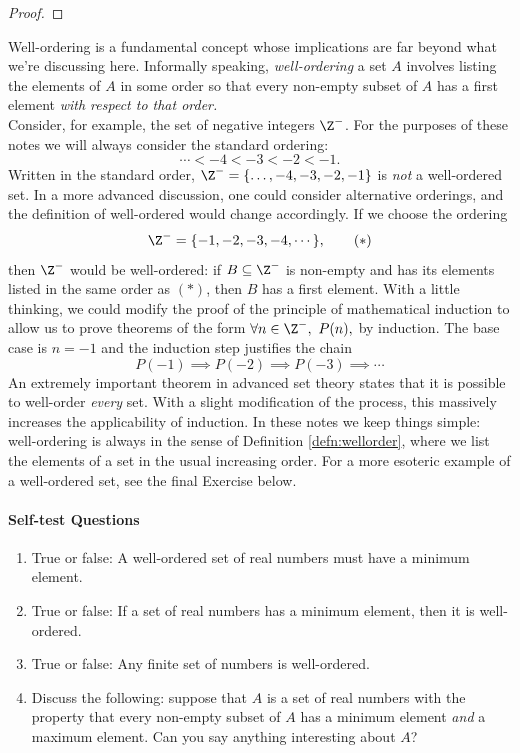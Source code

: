 \begin{proof}
\end{proof}

\begin{aside}

Well-ordering is a fundamental concept whose implications are far beyond what we're discussing here. Informally speaking, \emph{well-ordering} a set $A$ involves listing the elements of $A$ in some order so that every non-empty subset of $A$ has a first element \emph{with respect to that order.}\\
Consider, for example, the set of negative integers $\Z^-$. For the purposes of these notes we will always consider the standard ordering:
\[\cdots<-4<-3<-2<-1.\]
Written in the standard order, $\Z^-=\{\ldots,-4,-3,-2,-1\}$ is \emph{not} a well-ordered set. In a more advanced discussion, one could consider alternative orderings, and the definition of well-ordered would change accordingly. If we choose the ordering
\[\Z^-=\{-1,-2,-3,-4,\cdots\},\tag{$\ast$}\]
then $\Z^-$ would be well-ordered: if $B\subseteq\Z^-$ is non-empty and has its elements listed in the same order as $(\ast)$, then $B$ has a first element. With a little thinking, we could modify the proof of the principle of mathematical induction to allow us to prove theorems of the form $\forall n\in\Z^-,\ P(n),$ by induction. The base case is $n=-1$ and the induction step justifies the chain
\[P(-1)\implies P(-2)\implies P(-3)\implies\cdots\]
An extremely important theorem in advanced set theory states that it is possible to well-order \emph{every} set. With a slight modification of the process, this massively increases the applicability of induction. In these notes we keep things simple: well-ordering is always in the sense of Definition \ref{defn:wellorder}, where we list the elements of a set in the usual increasing order. For a more esoteric example of a well-ordered set, see the final Exercise below.
\end{aside}

\paragraph{Self-test Questions}

	\begin{enumerate}
    \item True or false: A well-ordered set of real numbers must have a minimum element.
    \item True or false: If a set of real numbers has a minimum element, then it is well-ordered.
    \item True or false: Any finite set of numbers is well-ordered.
    \item Discuss the following: suppose that $A$ is a set of real numbers with the property that every non-empty subset of $A$ has a minimum element \emph{and} a maximum element. Can you say anything interesting about $A$?
  \end{enumerate}


